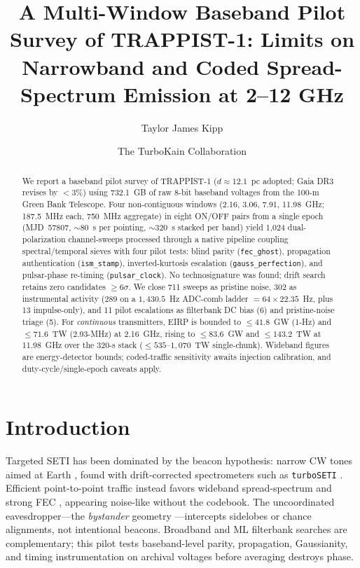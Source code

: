 \documentclass[twocolumn]{aastex631}
\begin{document}
\title{A Multi-Window Baseband Pilot Survey of TRAPPIST-1: Limits on Narrowband and Coded Spread-Spectrum Emission at 2--12 GHz}

\author{Taylor James Kipp}

\author{The TurboKain Collaboration}

\begin{abstract}
We report a baseband pilot survey of TRAPPIST-1 ($d\approx12.1$~pc adopted; Gaia DR3 revises by $<3$\%) using 732.1~GB of raw 8-bit baseband voltages from the 100-m Green Bank Telescope. Four non-contiguous windows (2.16, 3.06, 7.91, 11.98~GHz; 187.5~MHz each, 750~MHz aggregate) in eight ON/OFF pairs from a single epoch (MJD~57807, $\sim$80~s per pointing, $\sim$320~s stacked per band) yield 1,024 dual-polarization channel-sweeps processed through a native pipeline coupling spectral/temporal sieves with four pilot tests: blind parity (\texttt{fec\_ghost}), propagation authentication (\texttt{ism\_stamp}), inverted-kurtosis escalation (\texttt{gauss\_perfection}), and pulsar-phase re-timing (\texttt{pulsar\_clock}). No technosignature was found; drift search retains zero candidates $\ge6\sigma$. We close 711 sweeps as pristine noise, 302 as instrumental activity (289 on a $1{,}430.5$~Hz ADC-comb ladder $=64\times22.35$~Hz, plus 13 impulse-only), and 11 pilot escalations as filterbank DC bias (6) and pristine-noise triage (5). For \textit{continuous} transmitters, EIRP is bounded to $\le41.8$~GW (1-Hz) and $\le71.6$~TW (2.93-MHz) at 2.16~GHz, rising to $\le83.6$~GW and $\le143.2$~TW at 11.98~GHz over the 320-s stack ($\le535$--$1{,}070$~TW single-chunk). Wideband figures are energy-detector bounds; coded-traffic sensitivity awaits injection calibration, and duty-cycle/single-epoch caveats apply.
\end{abstract}


\section{Introduction}
\label{sec:intro}

Targeted SETI has been dominated by the beacon hypothesis: narrow CW tones aimed at Earth \citep{tarter2001, enriquez2017, margot2021}, found with drift-corrected spectrometers such as \texttt{turboSETI} \citep{enriquez2019}. Efficient point-to-point traffic instead favors wideband spread-spectrum and strong FEC \citep{shannon1948, gallager1962, mackay1999}, appearing noise-like without the codebook. The uncoordinated eavesdropper---the \textit{bystander} geometry \citep{gertz2016, benford2010, hippke2018, garrett2021}---intercepts sidelobes or chance alignments, not intentional beacons. Broadband and ML filterbank searches \citep{zhang2019, ma2023, brzycki2020} are complementary; this pilot tests baseband-level parity, propagation, Gaussianity, and timing instrumentation on archival voltages before averaging destroys phase.
\end{document}
